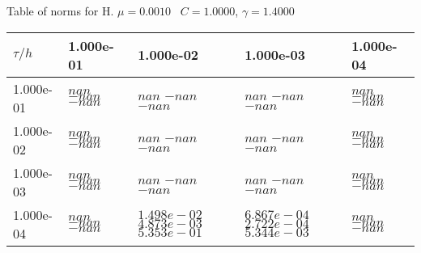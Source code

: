 \begin{center}
Table of norms for H. $\mu = 0.0010$ \, $C = 1.0000$, $\gamma = 1.4000$
  
\begin{tabular}{|p{1in}|p{1in}|p{1in}|p{1in}|p{1in}|} \hline
$\tau / h$ &1.000e-01 &1.000e-02 &1.000e-03 &1.000e-04 \\ \hline 
1.000e-01 & $nan$  $-nan$  $-nan$  & $nan$  $-nan$  $-nan$  & $nan$  $-nan$  $-nan$  & $nan$  $-nan$  $-nan$  \\ \hline 
1.000e-02 & $nan$  $-nan$  $-nan$  & $nan$  $-nan$  $-nan$  & $nan$  $-nan$  $-nan$  & $nan$  $-nan$  $-nan$  \\ \hline 
1.000e-03 & $nan$  $-nan$  $-nan$  & $nan$  $-nan$  $-nan$  & $nan$  $-nan$  $-nan$  & $nan$  $-nan$  $-nan$  \\ \hline 
1.000e-04 & $nan$  $-nan$  $-nan$  & $1.498e-02$  $4.873e-03$  $5.353e-01$  & $6.867e-04$  $2.722e-04$  $5.344e-03$  & $nan$  $-nan$  $-nan$  \\ \hline 

\end{tabular}\\[20pt]
\end{center}
